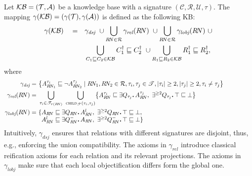 \documentclass[envcountsame,draft]{llncs}
\newcommand{\KB}{\ensuremath{\mathcal{KB}}\xspace}
\newcommand{\per}{\mathpunct{\mbox{\bf .}}}
\newcommand{\chd}[2]{\ensuremath{\textsc{child}_{\mathscr{T}}(#1,#2)}\xspace}
\newcommand{\A}{\ensuremath{\mathcal{A}}\xspace}
\begin{document}
Let $\KB = (\Tmc, \A)$ be a \DLRpm knowledge base with a signature
$(\mathcal{C},\mathcal{R},\mathcal{U},\tau)$. The mapping
$\gamma(\KB) = (\gamma(\Tmc),\gamma(\A))$ is defined as the following
\ALCQI KB:
%
\begin{align*}
  \gamma(\KB) \quad =& \quad \gamma_{\textit{dsj}} ~\cup %
  \bigcup_{R\!N\in\Rmc}\gamma_{\textit{rel}}(R\!N) ~\cup %
  \bigcup_{R\!N\in\Rmc}\gamma_{\textit{lobj}}({R\!N})
  ~\cup \\
  & \quad\bigcup_{C_1\sqsubseteq C_2\in\KB}{C_1^\dag\sqsubseteq C_2^\dag}
  ~\cup%
 \bigcup_{R_1\sqsubseteq R_2\in\KB}{R_1^\dag\sqsubseteq
    R_2^\dag},%
\end{align*}
%
where
%
\begin{align*}
\gamma_\textit{dsj} = %
&~\bigl\{A_{R\!N_1}^{\tau_i}\sqsubseteq\neg A_{R\!N_2}^{\tau_j} \mid R\!N_1, R\!N_2\in\Rmc,
  \tau_i, \tau_j\in \mathscr{T}, |\tau_i|\geq 2, |\tau_j|\geq 2, \tau_i\neq \tau_j
  \bigr\}\\
%
  \gamma_{\textit{rel}}(R\!N) =&~\bigcup_{\tau_i\in\mathscr{T}_{\tau(R\!N)}}~
     \bigcup_{\chd{\tau_i}{\tau_j}}\bigl\{
     A^{\tau_i}_{R\!N} \sqsubseteq \exists Q_{\tau_j}\per A^{\tau_j}_{R\!N},~\exists^{\geq 2}
     Q_{\tau_j}\per\top\sqsubseteq \bot
     \bigr\} \\
%
\gamma_{\textit{lobj}}({R\!N}) =&~\{\parbox[t]{\textwidth}{$
A_{R\!N}\sqsubseteq\exists Q_{R\!N}\per A_{R\!N}^l,~
\exists^{\geq 2}Q_{R\!N}\per \top\sqsubseteq \bot,\\
A_{R\!N}^l \sqsubseteq \exists Q_{R\!N}^-\per A_{R\!N},~
\exists^{\geq 2} Q_{R\!N}^-\per \top\sqsubseteq \bot\}$}
\end{align*}
%
Intuitively, $\gamma_\textit{dsj}$ ensures that relations with
different signatures are disjoint, thus, e.g., enforcing the union
compatibility. The axioms in $\gamma_{\textit{rel}}$ introduce
classical reification axioms for each relation and its relevant
projections. The axioms in $\gamma_{\textit{lobj}}$ make sure that
each local objectification differs form the global one. 
\end{document}
